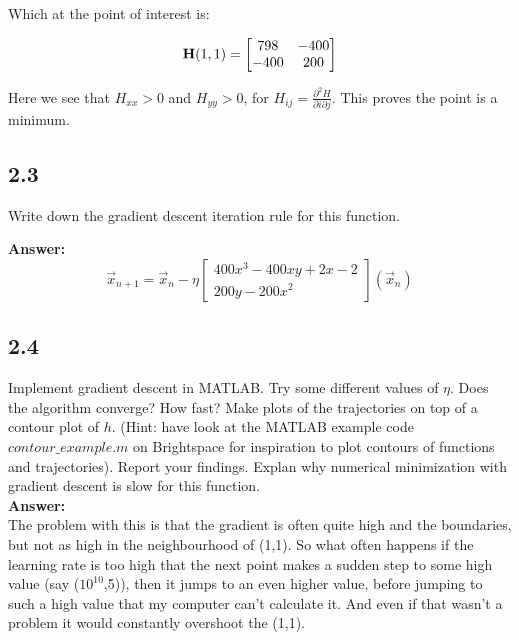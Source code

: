 \documentclass[a4paper]{article}
\begin{document}
Which at the point of interest is:

\begin{equation}
\bold H(1,1) = \begin{bmatrix}
798 & -400\\
-400 & 200
\end{bmatrix}
\end{equation}

Here we see that $H_{xx} > 0$ and $H_{yy} > 0$, for $H_{ij} = \frac{\partial^2 H}{\partial i \partial j}$. This proves the point is a minimum.

\subsection*{2.3}

Write down the gradient descent iteration rule for this function.

\textbf{Answer:}\\


\begin{equation}
\vec x_{n+1} = \vec x_n - \eta \begin{bmatrix}
400x^3-400xy+2x-2\\
200y-200x^2
\end{bmatrix}(\vec x_n)
\end{equation}

\subsection*{2.4}

Implement gradient descent in MATLAB. Try some different values of $\eta$. Does the algorithm converge? How fast? Make plots of the trajectories on top of a contour plot of $h$. (Hint: have look at the MATLAB example code $contour\_example.m$ on Brightspace for inspiration to plot contours of functions and trajectories). Report your findings. Explan why numerical minimization with gradient descent is slow for this function.\\

\textbf{Answer:}\\

The problem with this is that the gradient is often quite high and the boundaries, but not as high in the neighbourhood of (1,1). So what often happens if the learning rate is too high that the next point makes a sudden step to some high value (say ($10^10$,5)), then it jumps to an even higher value, before jumping to such a high value that my computer can't calculate it. And even if that wasn't a problem it would constantly overshoot the (1,1). 
\end{document}
